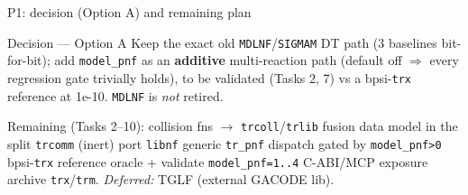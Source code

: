 \documentclass[10pt,aspectratio=169]{beamer}
\newcommand{\C}[1]{\texttt{\small #1}}          %
\begin{document}
\begin{frame}{P1: decision (Option A) and remaining plan}
\begin{block}{Decision --- Option A}
Keep the exact old \C{MDLNF}/\C{SIGMAM} DT path (3 baselines bit-for-bit); add \C{model\_pnf} as an
\textbf{additive} multi-reaction path (default off $\Rightarrow$ every regression gate trivially holds),
to be validated (Tasks 2, 7) vs a bpsi-\C{trx} reference at 1e-10. \C{MDLNF} is \emph{not} retired.
\end{block}
Remaining (Tasks 2--10): collision fns $\to$ \C{trcoll}/\C{trlib} \textbullet{} fusion data model in the
split \C{trcomm} (inert) \textbullet{} port \C{libnf} \textbullet{} generic \C{tr\_pnf} dispatch gated by
\C{model\_pnf>0} \textbullet{} bpsi-\C{trx} reference oracle + validate \C{model\_pnf=1..4}
\textbullet{} C-ABI/MCP exposure \textbullet{} archive \C{trx}/\C{trm}.
\emph{Deferred:} TGLF (external GACODE lib).
\end{frame}

\end{document}
